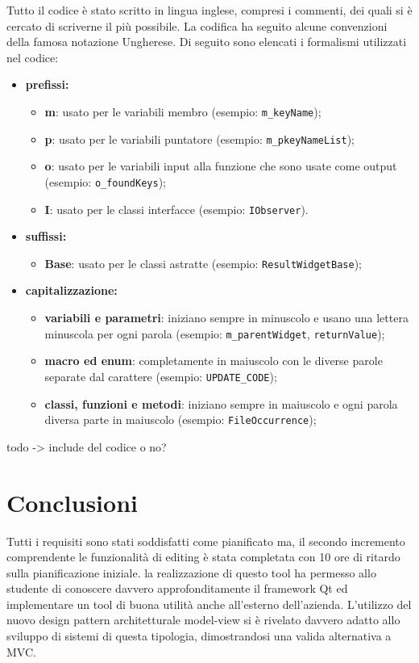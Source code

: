 Tutto il codice è stato scritto in lingua inglese, compresi i commenti, dei quali si è cercato di scriverne il più possibile.
La codifica ha seguito alcune convenzioni della famosa notazione Ungherese. Di seguito sono elencati i formalismi utilizzati nel codice:

\begin{itemize}
	\item \textbf{prefissi:}
	\begin{itemize}
		\item \textbf{m}: usato per le variabili membro (esempio: \texttt{m\_keyName});
		\item \textbf{p}: usato per le variabili puntatore (esempio: \texttt{m\_pkeyNameList});
		\item \textbf{o}: usato per le variabili input alla funzione che sono usate come output (esempio: \texttt{o\_foundKeys});
		\item \textbf{I}: usato per le classi interfacce (esempio: \texttt{IObserver}).
	\end{itemize}
	\item \textbf{suffissi:}
	\begin{itemize}
		\item \textbf{Base}: usato per le classi astratte (esempio: \texttt{ResultWidgetBase});
	\end{itemize}
	\item \textbf{capitalizzazione:}
	\begin{itemize}
		\item \textbf{variabili e parametri}: iniziano sempre in minuscolo e usano una lettera minuscola per ogni parola (esempio: \texttt{m\_parentWidget}, \texttt{returnValue});
		\item \textbf{macro ed enum}: completamente in maiuscolo con le diverse parole separate dal carattere \sq{\_} (esempio: \texttt{UPDATE\_CODE});
		\item \textbf{classi, funzioni e metodi}: iniziano sempre in maiuscolo e ogni parola diversa parte in maiuscolo (esempio: \texttt{FileOccurrence});
	\end{itemize}
\end{itemize}

todo -> include del codice o no?

\section{Conclusioni}
Tutti i requisiti sono stati soddisfatti come pianificato ma, il secondo incremento comprendente le funzionalità di editing è stata completata con 10 ore di ritardo sulla pianificazione iniziale. 
la realizzazione di questo tool ha permesso allo studente di conoscere davvero approfonditamente il framework Qt ed implementare un tool di buona utilità anche all'esterno dell'azienda. L'utilizzo del nuovo design pattern architetturale model-view si è rivelato davvero adatto allo sviluppo di sistemi di questa tipologia, dimostrandosi una valida alternativa a MVC.